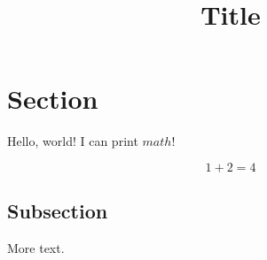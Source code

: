 \documentclass[10pt,a4paper]{article}
\begin{document}
\title{Title}

\maketitle 

\section{Section}

Hello, world! I can print $math$!

\[
1 + 2 = 4
\]

\subsection{Subsection}

More text.
\end{document}

